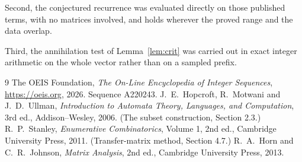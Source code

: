 \documentclass[11pt,a4paper]{article}
\theoremstyle{plain}
\theoremstyle{definition}
\begin{document}
Second, the conjectured recurrence was evaluated directly on those published terms, with no
matrices involved, and holds wherever the proved range and the data overlap.

Third, the annihilation test of Lemma~\ref{lem:crit} was carried out in exact integer
arithmetic on the whole vector rather than on a sampled prefix.

\begin{thebibliography}{9}
 The OEIS Foundation, \emph{The On-Line Encyclopedia of Integer
Sequences}, \url{https://oeis.org}, 2026. Sequence A220243.
 J.~E.~Hopcroft, R.~Motwani and J.~D.~Ullman, \emph{Introduction to Automata
Theory, Languages, and Computation}, 3rd ed., Addison--Wesley, 2006. (The subset
construction, Section 2.3.)
 R.~P.~Stanley, \emph{Enumerative Combinatorics}, Volume 1, 2nd ed.,
Cambridge University Press, 2011. (Transfer-matrix method, Section 4.7.)
 R.~A.~Horn and C.~R.~Johnson, \emph{Matrix Analysis}, 2nd ed., Cambridge
University Press, 2013.
\end{thebibliography}
\end{document}
